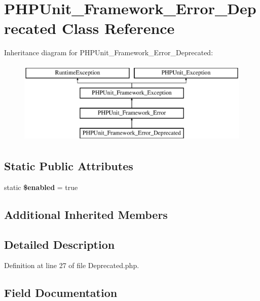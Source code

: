 \section{P\+H\+P\+Unit\+\_\+\+Framework\+\_\+\+Error\+\_\+\+Deprecated Class Reference}
\label{class_p_h_p_unit___framework___error___deprecated}
Inheritance diagram for P\+H\+P\+Unit\+\_\+\+Framework\+\_\+\+Error\+\_\+\+Deprecated\+:\begin{figure}[H]
\begin{center}
\leavevmode
\includegraphics[height=4.000000cm]{class_p_h_p_unit___framework___error___deprecated}
\end{center}
\end{figure}
\subsection*{Static Public Attributes}
\begin{DoxyCompactItemize}
\item 
static {\bf \$enabled} = true
\end{DoxyCompactItemize}
\subsection*{Additional Inherited Members}


\subsection{Detailed Description}


Definition at line 27 of file Deprecated.\+php.



\subsection{Field Documentation}
